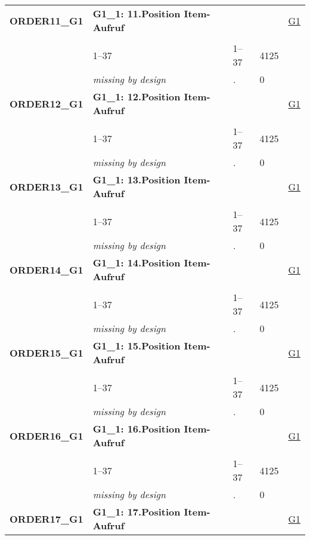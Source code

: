 \begin{longtable}{| L{2.65cm} | L{8cm} | C{1.5cm} | R{1.25cm} | C{2.25cm}  |}
   \midrule
\textbf{ORDER11\_G1}\label{var:ORDER11:G1} & \textbf{G1\_1: 11.Position Item-Aufruf} &  &  & \hyperref[G1]{G1} \\ 
   &  &  &  &  \\ 
   & 1--37 & 1--37 & 4125 &  \\ 
   & \textit{missing by design} & \textit{.} & 0 &  \\ 
   \midrule
\textbf{ORDER12\_G1}\label{var:ORDER12:G1} & \textbf{G1\_1: 12.Position Item-Aufruf} &  &  & \hyperref[G1]{G1} \\ 
   &  &  &  &  \\ 
   & 1--37 & 1--37 & 4125 &  \\ 
   & \textit{missing by design} & \textit{.} & 0 &  \\ 
   \midrule
\textbf{ORDER13\_G1}\label{var:ORDER13:G1} & \textbf{G1\_1: 13.Position Item-Aufruf} &  &  & \hyperref[G1]{G1} \\ 
   &  &  &  &  \\ 
   & 1--37 & 1--37 & 4125 &  \\ 
   & \textit{missing by design} & \textit{.} & 0 &  \\ 
   \midrule
\textbf{ORDER14\_G1}\label{var:ORDER14:G1} & \textbf{G1\_1: 14.Position Item-Aufruf} &  &  & \hyperref[G1]{G1} \\ 
   &  &  &  &  \\ 
   & 1--37 & 1--37 & 4125 &  \\ 
   & \textit{missing by design} & \textit{.} & 0 &  \\ 
   \midrule
\textbf{ORDER15\_G1}\label{var:ORDER15:G1} & \textbf{G1\_1: 15.Position Item-Aufruf} &  &  & \hyperref[G1]{G1} \\ 
   &  &  &  &  \\ 
   & 1--37 & 1--37 & 4125 &  \\ 
   & \textit{missing by design} & \textit{.} & 0 &  \\ 
   \midrule
\textbf{ORDER16\_G1}\label{var:ORDER16:G1} & \textbf{G1\_1: 16.Position Item-Aufruf} &  &  & \hyperref[G1]{G1} \\ 
   &  &  &  &  \\ 
   & 1--37 & 1--37 & 4125 &  \\ 
   & \textit{missing by design} & \textit{.} & 0 &  \\ 
   \midrule
\textbf{ORDER17\_G1}\label{var:ORDER17:G1} & \textbf{G1\_1: 17.Position Item-Aufruf} &  &  & \hyperref[G1]{G1} \\ 

\end{longtable}

